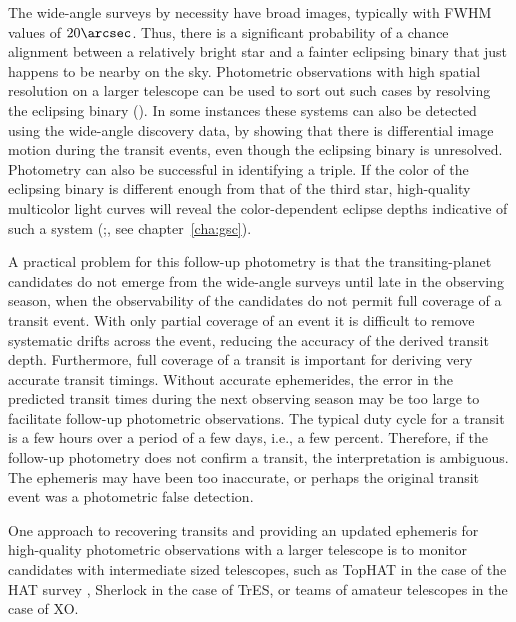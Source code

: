 The wide-angle surveys by necessity have broad images, typically with FWHM values of $20\arcsec$.
Thus, there is a significant probability of a chance alignment between a relatively bright star and a
fainter eclipsing binary that just happens to be nearby on the sky. Photometric observations with high
spatial resolution on a larger telescope can be used to sort out such cases by resolving the eclipsing binary
(\citealp[see, e.g.,][]{Charbonneau_Brown_Dunham:AIP:2004a}). In some instances these systems can also be detected%
using the wide-angle discovery data, by showing that there is differential image motion during the transit events,
even though the eclipsing binary is unresolved. Photometry can also be successful in identifying a triple.
If the color of the eclipsing binary is different enough from that of the third star, high-quality multicolor
light curves will reveal the color-dependent eclipse depths indicative of such a system
(\citealp[see, e.g.,][]{Tingley:aa:2004a};\@ \citealp{ODonovan_Charbonneau_Torres:apj:2006a}, see chapter~\ref{cha:gsc}).%

A practical problem for this follow-up photometry is that the transiting-planet candidates do not emerge from the wide-angle surveys until late in the observing season, when the observability of the candidates do not permit full coverage of a transit event. With only partial coverage of an event it is difficult to remove systematic drifts across the event, reducing the accuracy of the derived transit depth. Furthermore, full coverage of a transit is important for deriving very accurate transit timings. Without accurate ephemerides, the error in the predicted transit times during the next observing season may be too large to facilitate follow-up photometric observations. The typical duty cycle for a transit is a few hours over a period of a few days, i.e., a few percent. Therefore, if the follow-up photometry does not confirm a transit, the interpretation is ambiguous. The ephemeris may have been too inaccurate, or perhaps the original transit event was a photometric false detection.

One approach to recovering transits and providing an updated ephemeris for high-quality photometric observations with a
larger telescope is to monitor candidates with intermediate sized telescopes, such as TopHAT in the case of the HAT
survey \citep{Bakos_Noyes_Kovacs:pasp:2004a}, Sherlock \citep{Kotredes_Charbonneau_Looper:2004a} in the case of TrES,
or teams of amateur telescopes \citep{McCullough_Stys_Valenti:apj:2006a} in the case of XO.\@

